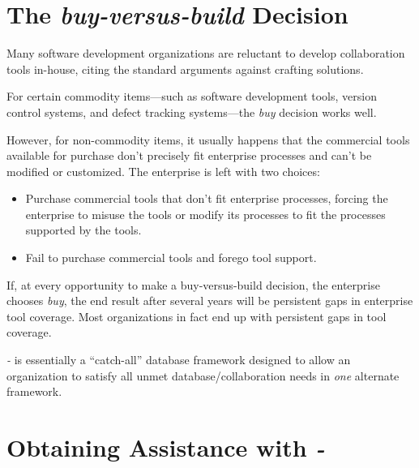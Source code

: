 \section{The \emph{buy-versus-build} Decision}
\label{ciov0:sbvb0}


Many software development organizations are reluctant to develop collaboration
tools in-house, citing the standard arguments against crafting solutions.

For certain commodity items---such as software development tools, version control
systems, and defect tracking systems---the \emph{buy} decision works well.

However, for non-commodity items, it usually happens that the commercial tools
available for purchase don't precisely fit enterprise processes and can't be
modified or customized.  The enterprise is left with two choices:

\begin{itemize}
\item Purchase commercial tools that don't fit enterprise processes, forcing
      the enterprise to misuse the tools or modify its processes to fit the
      processes supported by the tools.
\item Fail to purchase commercial tools and forego tool support.      
\end{itemize}

If, at every opportunity to make a buy-versus-build decision, the enterprise
chooses \emph{buy}, the end result after several years will be persistent gaps
in enterprise tool coverage.  Most organizations in fact end up with
persistent gaps in tool coverage.

\emph{\productbasename{}-\productversion{}} is essentially a ``catch-all''
database framework designed to allow an organization to satisfy all unmet 
database/collaboration needs in \emph{one} alternate framework.


\section{Obtaining Assistance with \emph{\productbasename{}-\productversion{}}}
\label{ciov0:soas0}

